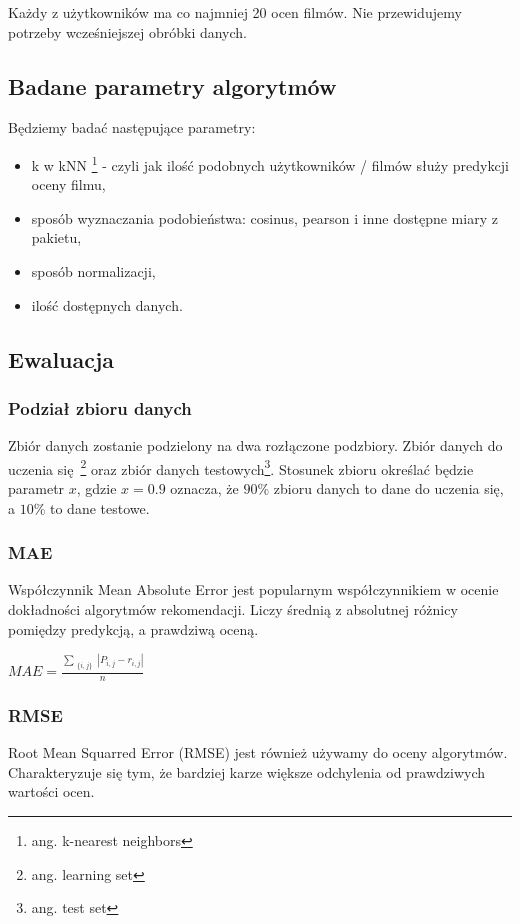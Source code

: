 \documentclass[12pt, a4paper]{article}
\begin{document}
Każdy z użytkowników ma co najmniej 20 ocen filmów. Nie przewidujemy potrzeby wcześniejszej obróbki danych.

\subsection{Badane parametry algorytmów}
Będziemy badać następujące parametry:
\begin{itemize}
\item k w kNN \footnote{ang. k-nearest neighbors} - czyli jak ilość podobnych użytkowników / filmów służy predykcji oceny filmu,
\item sposób wyznaczania podobieństwa: cosinus, pearson i inne dostępne miary z pakietu,
\item sposób normalizacji,
\item ilość dostępnych danych.
\end{itemize}


\subsection{Ewaluacja}

\subsubsection{Podział zbioru danych}
Zbiór danych zostanie podzielony na dwa rozłączone podzbiory. Zbiór danych do uczenia się\
\footnote{ang. learning set} oraz zbiór danych testowych\footnote{ang. test set}. Stosunek
zbioru określać będzie parametr $x$, gdzie $x = 0.9$ oznacza, że $90\%$ zbioru danych to
dane do uczenia się, a $10\%$ to dane testowe.

\subsubsection{MAE}
Współczynnik Mean Absolute Error jest popularnym współczynnikiem w ocenie dokładności
algorytmów rekomendacji. Liczy średnią z absolutnej różnicy pomiędzy predykcją, a prawdziwą
oceną.

\begin{math}
MAE = \frac{
        \sum_{\substack{
   \{i, j\}
  }}
  |P_{i,j} - r_{i,j}|
}{n}
\end{math}

\subsubsection{RMSE}
Root Mean Squarred Error (RMSE) jest również używamy do oceny algorytmów. Charakteryzuje
się tym, że bardziej karze większe odchylenia od prawdziwych wartości ocen.
\end{document}

